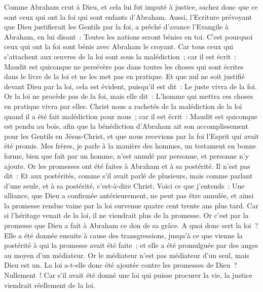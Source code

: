 \begin{multicols}{2}
Comme Abraham crut à Dieu, et cela lui fut imputé à justice,
sachez donc que ce sont ceux qui ont la foi qui sont enfants d'Abraham.
Aussi, l'Ecriture prévoyant que Dieu justifierait les Gentils par la foi, a prêché d'avance l'Evangile à Abraham, en lui disant~: Toutes les nations seront bénies en toi.
C'est pourquoi ceux qui ont la foi sont bénis avec Abraham le croyant.
Car tous ceux qui s'attachent aux œuvres de la loi sont sous la malédiction~; car il est écrit~: Maudit est quiconque ne persévère pas dans toutes les choses qui sont écrites dans le livre de la loi et ne les met pas en pratique.
Et que nul ne soit justifié devant Dieu par la loi, cela est évident, puisqu'il est dit~: Le juste vivra de la foi.
Or la loi ne procède pas de la foi, mais elle dit~: L'homme qui mettra ces choses en pratique vivra par elles.
Christ nous a rachetés de la malédiction de la loi quand il a été fait malédiction pour nous~; car il est écrit~: Maudit est quiconque est pendu au bois,
afin que la bénédiction d'Abraham ait son accomplissement pour les Gentils en Jésus-Christ, et que nous recevions par la foi l'Esprit qui avait été promis.
Mes frères, je parle à la manière des hommes, un testament en bonne forme, bien que fait par un homme, n'est annulé par personne, et personne n'y ajoute.
Or les promesses ont été faites à Abraham et à sa postérité. Il n'est pas dit~: Et aux postérités, comme s'il avait parlé de plusieurs, mais comme parlant d'une seule, et à sa postérité, c'est-à-dire Christ.
Voici ce que j'entends~: Une alliance, que Dieu a confirmée antérieurement, ne peut pas être annulée, et ainsi la promesse rendue vaine par la loi survenue quatre cent trente ans plus tard.
Car si l'héritage venait de la loi, il ne viendrait plus de la promesse. Or c'est par la promesse que Dieu a fait à Abraham ce don de sa grâce.
A quoi donc sert la loi~? Elle a été donnée ensuite à cause des transgressions, jusqu'à ce que vienne la postérité à qui la promesse avait été faite~; et elle a été promulguée par des anges au moyen d'un médiateur.
Or le médiateur n'est pas médiateur d'un seul, mais Dieu est un.
La loi a-t-elle donc été ajoutée contre les promesses de Dieu~? Nullement~! Car s'il avait été donné une loi qui puisse procurer la vie, la justice viendrait réellement de la loi.

\end{multicols}
